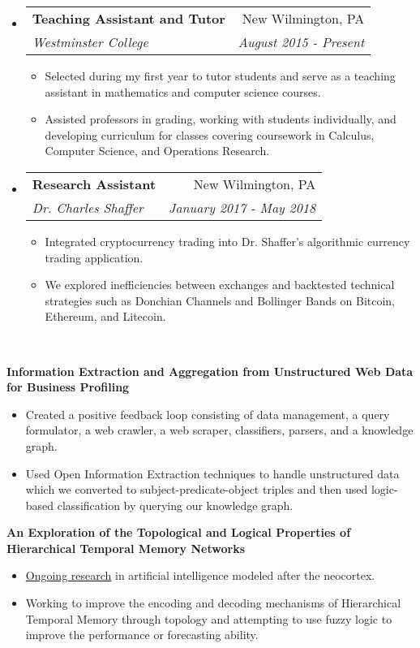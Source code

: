 \documentclass[letterpaper,11pt]{article}
\makeatletter
\newcommand{\resitem}[1]{\item #1 \vspace{-2pt}}
\newcommand{\resheading}[1]{{\large \colorbox{mypurple}{\begin{minipage}{\textwidth}{\textbf{#1 \vphantom{p\^{E}}}}\end{minipage}}}}
\newcommand{\ressubheading}[4]{
	\begin{tabular*}{7.0in}{l@{\extracolsep{\fill}}r}
		\textbf{#1} & #2 \\
		\textit{#3} & \textit{#4} \\
	\end{tabular*}\vspace{-6pt}}
\makeatother
\begin{document}
\begin{itemize}
	\item
		\ressubheading{Teaching Assistant and Tutor}{New Wilmington, PA}{Westminster College}{August 2015 - Present}
		\begin{itemize}
			\resitem{Selected during my first year to tutor students and serve as a teaching assistant in mathematics and computer science courses.}
			\resitem{Assisted professors in grading, working with students individually, and developing curriculum for classes covering coursework in Calculus, Computer Science, and Operations Research.}
		\end{itemize}
		
		\item
		\ressubheading{Research Assistant}{New Wilmington, PA}{Dr. Charles Shaffer}{January 2017 - May 2018}
		\begin{itemize}
			\resitem{Integrated cryptocurrency trading into Dr. Shaffer's algorithmic currency trading application.}
			\resitem{We explored inefficiencies between exchanges and backtested technical strategies such as Donchian Channels and Bollinger Bands on Bitcoin, Ethereum, and Litecoin.}
		\end{itemize}
		
		\pagebreak
		
	\end{itemize}
	
	\resheading{\textcolor{white}{Research}}
	
		\vspace{0.1in}

		\textbf{Information Extraction and Aggregation from Unstructured Web Data for Business Profiling}
		\begin{itemize}
			\resitem{Created a positive feedback loop consisting of data management, a query formulator, a web crawler, a web scraper, classifiers, parsers, and a knowledge graph.}
			\resitem{Used Open Information Extraction techniques to handle unstructured data which we converted to subject-predicate-object triples and then used logic-based classification by querying our knowledge graph.}
	\end{itemize}

		\textbf{An Exploration of the Topological and Logical Properties of Hierarchical Temporal Memory Networks}
		\begin{itemize}
			\resitem{\href{https://github.com/alexandermichels/HonorsResearch}{Ongoing research} in artificial intelligence modeled after the neocortex.}
			\resitem{Working to improve the encoding and decoding mechanisms of Hierarchical Temporal Memory through topology and attempting to use fuzzy logic to improve the performance or forecasting ability.}
		\end{itemize}
\end{document}

